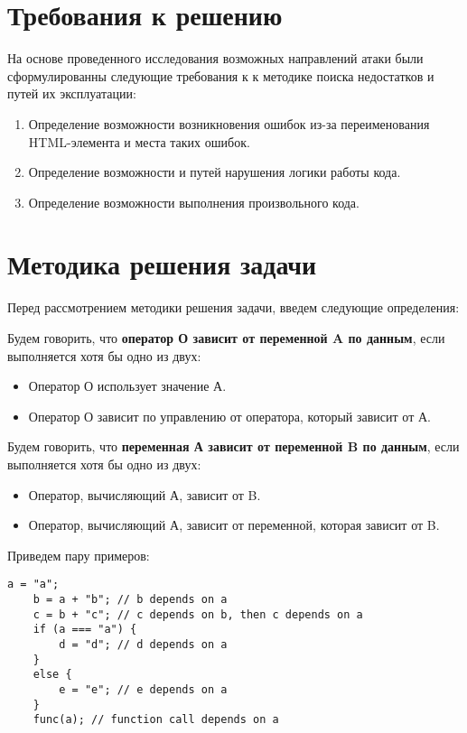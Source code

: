 \section{Требования к решению}
На основе проведенного исследования возможных направлений атаки были сформулированны следующие требования к к методике поиска недостатков и путей их эксплуатации:

\begin{enumerate}
	\item Определение возможности возникновения ошибок из-за переименования \\HTML-элемента и места таких ошибок.
	\item Определение возможности и путей нарушения логики работы кода.
	\item Определение возможности выполнения произвольного кода.
\end{enumerate}

\section{Методика решения задачи}
Перед рассмотрением методики решения задачи, введем следующие определения:


Будем говорить, что \textbf{оператор О зависит от переменной A по данным}, если выполняется хотя бы одно из двух:

\bigskip
\begin{itemize}
	\item Оператор О использует значение А.
	\item Оператор О зависит по управлению от оператора, который зависит от А.
\end{itemize}


Будем говорить, что \textbf{переменная А зависит от переменной B по данным}, если выполняется хотя бы одно из двух:
\begin{itemize}
	\item Оператор, вычисляющий А, зависит от B.
	\item Оператор, вычисляющий А, зависит от переменной, которая зависит от B.
\end{itemize}

\bigskip
Приведем пару примеров:
\begin{lstlisting}[caption=пример вычисления зависимостей]
	a = "a";
	b = a + "b"; // b depends on a
	c = b + "c"; // c depends on b, then c depends on a
	if (a === "a") { 
		d = "d"; // d depends on a
	}
	else {
		e = "e"; // e depends on a
	}
	func(a); // function call depends on a
\end{lstlisting}
\bigskip


